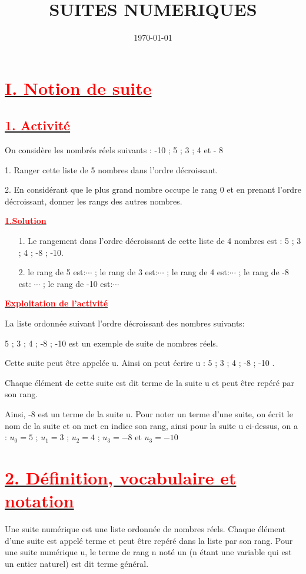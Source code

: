 \documentclass[12pt]{article}
\author{}
\title{\textbf{SUITES NUMERIQUES}}
\date{\today}
\begin{document}
\maketitle
\newpage

\section*{\underline{\textbf{\textcolor{red}{I. Notion de suite}}}} 
\subsection*{\underline{\textbf{\textcolor{red}{1. Activité}}}} 
On considère les nombrés réels suivants : -10 ; 5 ; 3 ; 4 et - 8

1. Ranger cette liste de 5 nombres dans l’ordre décroissant.

2. En considérant que le plus grand nombre occupe le rang 0 et en prenant l’ordre décroissant, donner les
rangs des autres nombres.

\underline{\textbf{\textcolor{red}{1.Solution}}}
\begin{itemize}
\item[1.]Le rangement dans l’ordre décroissant de cette liste de 4 nombres est : 5 ; 3 ; 4 ; -8 ; -10.

\item[2.] le rang de 5 est:$\cdots$ ; le rang de 3 est:$\cdots$ ; le rang de 4 est:$\cdots$ ; le rang de -8 est: $\cdots$ ; le rang de -10 est:$\cdots$
\end{itemize}
\underline{\textbf{\textcolor{red}{Exploitation de l'activité}}}

La liste ordonnée suivant l’ordre décroissant des nombres suivants:

5 ; 3 ; 4 ; -8 ; -10 est un exemple de suite de nombres réels.

Cette suite peut être appelée u. Ainsi on peut écrire u : 5 ; 3 ; 4 ; -8 ; -10 . 

Chaque élément de cette suite est dit terme de la suite u et peut être repéré par son rang. 

Ainsi, -8 est un terme de la suite u. Pour noter un terme d’une suite, on écrit le nom de la suite et on met en indice son rang, ainsi pour la suite u ci-dessus, on a : $u_{0}=5$ ; $u_{1}=3$ ; $u_{2}=4$ ; $u_{3}=-8 $ et $u_{3}=-10 $ 
\section*{\underline{\textbf{\textcolor{red}{2. Définition, vocabulaire et notation}}}}
Une suite numérique est une liste ordonnée de nombres réels. Chaque élément d’une suite est appelé terme
et peut être repéré dans la liste par son rang. Pour une suite numérique u, le terme de rang n noté un (n étant
une variable qui est un entier naturel) est dit terme général.
\end{document}

